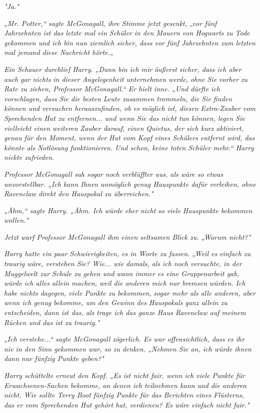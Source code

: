 {\emph{"Ja."}

\emph{„Mr. Potter,“ sagte McGonagall, ihre Stimme jetzt gesenkt, „vor fünf Jahrzehnten ist das letzte mal ein Schüler in den Mauern von Hogwarts zu Tode gekommen und ich bin nun ziemlich sicher, dass vor fünf Jahrzehnten zum letzten mal jemand diese Nachricht hörte.„}

\emph{Ein Schauer durchlief Harry. „Dann bin ich mir} \emph{\emph{äußerst}} \emph{sicher, dass ich aber auch} \emph{\emph{gar nichts}} \emph{in dieser Angelegenheit unternehmen werde, ohne Sie} \emph{vorher zu Rate zu ziehen, Professor McGonagall.“ Er hielt inne. „Und dürfte ich vorschlagen, dass Sie die besten Leute zusammen trommeln, die Sie finden können und versuchen herauszufinden, ob es möglich ist, diesen Extra-Zauber vom Sprechenden Hut zu entfernen... und wenn Sie das nicht tun können, legen Sie vielleicht einen} \emph{\emph{weiteren}} \emph{Zauber darauf, einen Quietus, der sich kurz aktiviert, genau für den Moment, wenn der Hut vom Kopf eines Schülers entfernt wird, das könnte als Notlösung funktionieren. Und schon, keine toten Schüler mehr.“ Harry nickte zufrieden.}

\emph{Professor McGonagall sah sogar noch verblüffter aus, als wäre so etwas unvorstellbar. „Ich kann Ihnen} \emph{\emph{unmöglich}} \emph{genug Hauspunkte dafür verleihen, ohne Ravenclaw direkt den Hauspokal zu überreichen."}

\emph{„Ähm,“ sagte Harry. „Ähm. Ich würde eher nicht} \emph{\emph{so}} \emph{viele Hauspunkte bekommen wollen."}

\emph{Jetzt warf Professor McGonagall ihm einen seltsamen Blick zu. „Warum nicht?"}

\emph{Harry hatte ein paar Schwierigkeiten, es in Worte zu fassen. „Weil es einfach zu traurig wäre, verstehen Sie? Wie... wie damals, als ich noch versuchte, in der Muggelwelt zur Schule zu gehen und wann immer es eine Gruppenarbeit gab, würde ich alles allein machen, weil die anderen mich nur bremsen würden. Ich habe nichts dagegen, viele Punkte zu bekommen, sogar mehr als alle anderen, aber wenn ich genug bekomme, um den Gewinn des Hauspokals ganz allein zu entscheiden, dann ist das, als trage ich das ganze Haus Ravenclaw auf meinem Rücken und das ist zu traurig."}

\emph{„Ich verstehe...“ sagte McGonagall zögerlich. Es war offensichtlich, dass es ihr nie in den Sinn gekommen war, so zu denken. „Nehmen Sie an, ich würde ihnen dann nur fünfzig Punkte geben?"}

\emph{Harry schüttelte erneut den Kopf. „Es ist nicht fair, wenn ich viele Punkte für Erwachsenen-Sachen bekomme, an denen ich teilnehmen kann und die anderen nicht. Wie sollte Terry Boot fünfzig Punkte für das Berichten eines Flüsterns, das er vom Sprechenden Hut gehört hat, verdienen? Es wäre einfach nicht fair."}

}
